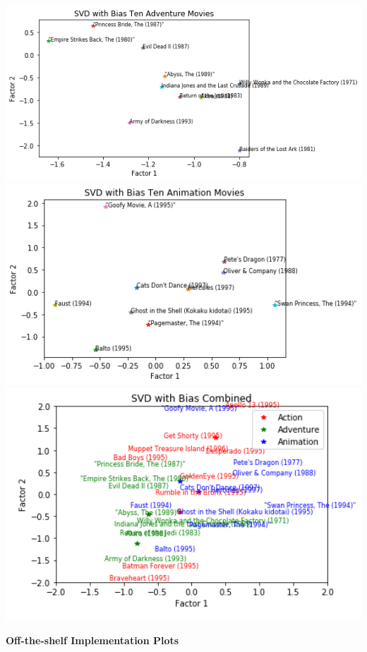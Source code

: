 \begin{center}
	\includegraphics[width=19cm]{Pictures/Bias_adventure}
	\includegraphics[width=16cm]{Pictures/Bias_animation}
	\includegraphics[width=16cm]{Pictures/Bias_combined}
\end{center}
\newpage
\noindent\textbf{Off-the-shelf Implementation Plots }\\








